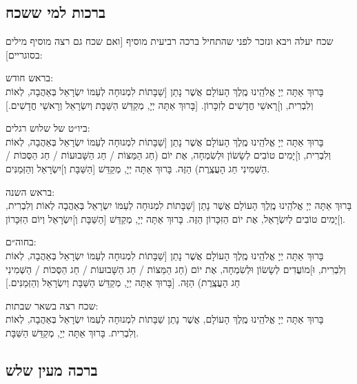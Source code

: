 \documentclass[11pt,twoside]{article}
\newcommand{\instruction}[1]{%
\ifhmode\else\noindent\fi%
{\plain\tiny{#1}}%
}
\begin{document}
\subsection*{ברכות למי ששכח}
{\footnotesize%
\instruction{%
שכח יעלה ויבא ונזכר לפני שהתחיל ברכה רביעית מוסיף
[ואם שכח גם רצה מוסיף מילים בסוגריים]:%
}

\instruction{בראש חודש:}\\
בָּרוּךְ אַתָּה יְיָ אֱלֹהֵֽינוּ מֶֽלֶךְ הָעוֹלָם אֲשֶׁר נָתַן [שַׁבָּתוֹת לִמְנוּחָה לְעַמּוֹ יִשְׂרָאֵל בְּאַהֲבָה,
לְאוֹת וְלִבְרִית, וְ]רָאשֵׁי חֳדָשִׁים לְזִכָּרוֹן. [בָּרוּךְ אַתָּה יְיָ, מְקַדֵּשׁ הַשַּׁבָּת וְיִשְׂרָאֵל וְרָאשֵׁי
חֳדָשִׁים.]

\instruction{ביו״ט של שלוש רגלים:}\\
בָּרוּךְ אַתָּה יְיָ אֱלֹהֵֽינוּ מֶֽלֶךְ הָעוֹלָם אֲשֶׁר נָתַן [שַׁבָּתוֹת לִמְנוּחָה לְעַמּוֹ יִשְׂרָאֵל בְּאַהֲבָה,
לְאוֹת וְלִבְרִית, וְ]יָמִים טוֹבִים לְשָׂשׂוֹן וּלְשִׂמְחָה, אֶת יוֹם (חַג הַמַּצּוֹת / חַג הַשָּׁבוּעוֹת /
חַג הַסֻּכּוֹת / הַשְּׁמִינִי חַג הָעֲצֶֽרֶת) הַזֶּה. בָּרוּךְ אַתָּה יְיָ, מְקַדֵּשׁ [הַשַּׁבָּת וְ]יִשְׂרָאֵל
וְהַזְּמַנִּים.

\instruction{בראש השנה:}\\
בָּרוּךְ אַתָּה יְיָ אֱלֹהֵֽינוּ מֶֽלֶךְ הָעוֹלָם אֲשֶׁר נָתַן [שַׁבָּתוֹת לִמְנוּחָה לְעַמּוֹ יִשְׂרָאֵל בְּאַהֲבָה
לְאוֹת וְלִבְרִית, וְ]יָמִים טוֹבִים לְיִשְׂרָאֵל, אֶת יוֹם הַזִּכָּרוֹן הַזֶּה. בָּרוּךְ אַתָּה יְיָ, מְקַדֵּשׁ
[הַשַּׁבָּת וְ]יִשְׂרָאֵל וְיוֹם הַזִּכָּרוֹן.

\instruction{בחוה״ם:}\\
בָּרוּךְ אַתָּה יְיָ אֱלֹהֵֽינוּ מֶֽלֶךְ הָעוֹלָם אֲשֶׁר נָתַן [שַׁבָּתוֹת לִמְנוּחָה לְעַמּוֹ יִשְׂרָאֵל בְּאַהֲבָה,
לְאוֹת וְלִבְרִית, וּ]מוֹעֲדִים לְשָׂשׂוֹן וּלְשִׂמְחָה, אֶת יוֹם (חַג הַמַּצּוֹת / חַג הַשָּׁבוּעוֹת / חַג
הַסֻּכּוֹת / הַשְּׁמִינִי חַג הָעֲצֶֽרֶת) הַזֶּה. [בָּרוּךְ אַתָּה יְיָ, מְקַדֵּשׁ הַשַּׁבָּת וְיִשְׂרָאֵל וְהַזְּמַנִּים.]

\instruction{שכח רצה בשאר שבתות:}\\
בָּרוּךְ אַתָּה יְיָ אֱלֹהֵֽינוּ מֶֽלֶךְ הָעוֹלָם, אֲשֶׁר נָתַן שַׁבָּתוֹת לִמְנוּחָה לְעַמּוֹ יִשְׂרָאֵל בְּאַהֲבָה,
לְאוֹת וְלִבְרִית. בָּרוּךְ אַתָּה יְיָ, מְקַדֵּשׁ הַשַּׁבָּת.
} %

\newpage

\subsection{ברכה מעין שלש}
\end{document}
